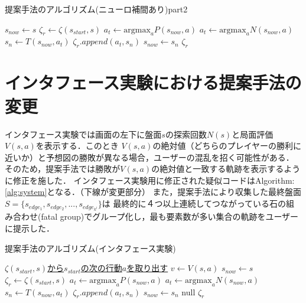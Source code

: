 \begin{algorithm}
    \caption{提案手法のアルゴリズム(ニューロ補間あり)part2}
    \label{alg:neuro-2}
    \begin{algorithmic}[1] 
        \State $s_{now} \gets s$
        \State $\zeta_r \gets \zeta(s_{start}, s)$
                \State \underline{$a_t \gets \textrm{argmax}_a P(s_{now}, a)$}
            \Else
                \State $a_t \gets \textrm{argmax}_a N(s_{now}, a)$
            \EndIf
            \State $s_n \gets T(s_{now}, a_t)$
            \State $\zeta_r.append({a_t, s_n})$
            \State $s_{now} \gets s_n$
        \EndWhile
        \Return $\zeta_r$
        \EndFunction
       
        
    \end{algorithmic}
\end{algorithm}
\section{インタフェース実験における提案手法の変更}
\label{sec:fix}
インタフェース実験では画面の左下に盤面$s$の探索回数$N(s)$と局面評価$V(s, a)$を表示する．このとき
$V(s, a)$の絶対値（どちらのプレイヤーの勝利に近いか）と予想図の勝敗が異なる場合，ユーザーの混乱を招く可能性がある．
そのため，提案手法では勝敗が$V(s, a)$の絶対値と一致する軌跡を表示するように修正を施した．
インタフェース実験用に修正された疑似コードはAlgorithm:\ref{alg:system}となる．（下線が変更部分）
また，提案手法により収集した最終盤面$S=\{s_{edge_1}, s_{edge_2}, ..., s_{edge_{k^l}}\}$は
最終的に４つ以上連続してつながっている石の組み合わせ(fatal group)でグループ化し，最も要素数が多い集合の軌跡をユーザーに提示した．

\begin{algorithm}
    \caption{提案手法のアルゴリズム(インタフェース実験)}
    \label{alg:system}
    \begin{algorithmic}[1]       
        
        \State  \underline{$\zeta(s_{start}, s)$から$s_{start}$の次の行動$a$を取り出す}
        \State \underline{$v \gets V(s, a)$}
        \State $s_{now} \gets s$
        \State $\zeta_r \gets \zeta(s_{start}, s)$
                \State \underline{$a_t \gets \textrm{argmax}_a P(s_{now}, a)$}
            \Else
                \State $a_t \gets \textrm{argmax}_a N(s_{now}, a)$
            \EndIf
            \State $s_n \gets T(s_{now}, a_t)$
            \State $\zeta_r.append({a_t, s_n})$
            \State $s_{now} \gets s_n$
        \EndWhile
           \Return null
        \EndIf
        \Return $\zeta_r$
        \EndFunction
       
        
    \end{algorithmic}
\end{algorithm}
